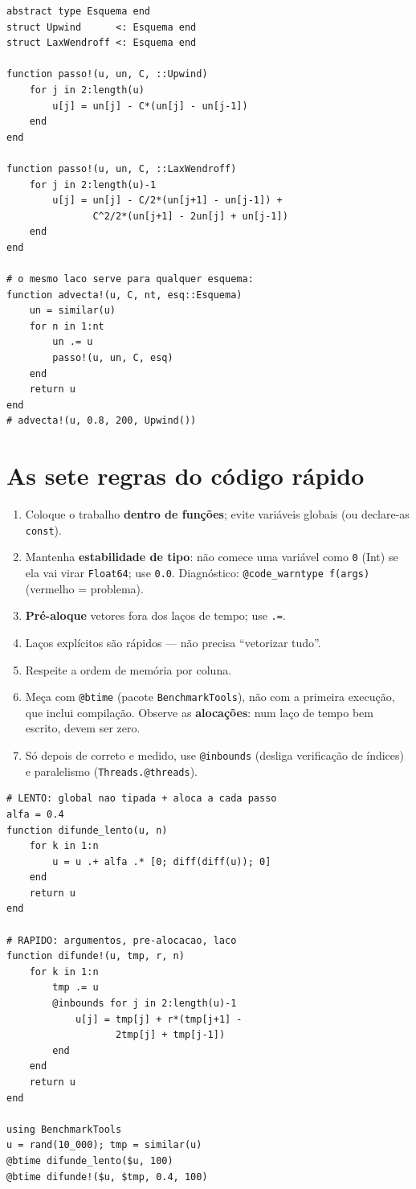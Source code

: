 \documentclass[10pt,a4paper,twocolumn,openany]{report}
\newenvironment{conceito}[1]{\section{#1}}{\par}
\begin{document}
\begin{lstlisting}[caption={Dispatch: um tipo por esquema numerico}]
abstract type Esquema end
struct Upwind      <: Esquema end
struct LaxWendroff <: Esquema end

function passo!(u, un, C, ::Upwind)
    for j in 2:length(u)
        u[j] = un[j] - C*(un[j] - un[j-1])
    end
end

function passo!(u, un, C, ::LaxWendroff)
    for j in 2:length(u)-1
        u[j] = un[j] - C/2*(un[j+1] - un[j-1]) +
               C^2/2*(un[j+1] - 2un[j] + un[j-1])
    end
end

# o mesmo laco serve para qualquer esquema:
function advecta!(u, C, nt, esq::Esquema)
    un = similar(u)
    for n in 1:nt
        un .= u
        passo!(u, un, C, esq)
    end
    return u
end
# advecta!(u, 0.8, 200, Upwind())
\end{lstlisting}

\begin{conceito}{As sete regras do código rápido}
\begin{enumerate}
  \item Coloque o trabalho \textbf{dentro de funções}; evite variáveis
        globais (ou declare-as \texttt{const}).
  \item Mantenha \textbf{estabilidade de tipo}: não comece uma variável como
        \texttt{0} (Int) se ela vai virar \texttt{Float64}; use \texttt{0.0}.
        Diagnóstico: \texttt{@code\_warntype f(args)} (vermelho = problema).
  \item \textbf{Pré-aloque} vetores fora dos laços de tempo; use \texttt{.=}.
  \item Laços explícitos são rápidos --- não precisa ``vetorizar tudo''.
  \item Respeite a ordem de memória por coluna.
  \item Meça com \texttt{@btime} (pacote \texttt{BenchmarkTools}), não com
        a primeira execução, que inclui compilação. Observe as
        \textbf{alocações}: num laço de tempo bem escrito, devem ser zero.
  \item Só depois de correto e medido, use \texttt{@inbounds} (desliga
        verificação de índices) e paralelismo (\texttt{Threads.@threads}).
\end{enumerate}
\end{conceito}

\begin{lstlisting}[caption={Lento vs. rapido: o mesmo calculo}]
# LENTO: global nao tipada + aloca a cada passo
alfa = 0.4
function difunde_lento(u, n)
    for k in 1:n
        u = u .+ alfa .* [0; diff(diff(u)); 0]
    end
    return u
end

# RAPIDO: argumentos, pre-alocacao, laco
function difunde!(u, tmp, r, n)
    for k in 1:n
        tmp .= u
        @inbounds for j in 2:length(u)-1
            u[j] = tmp[j] + r*(tmp[j+1] -
                   2tmp[j] + tmp[j-1])
        end
    end
    return u
end

using BenchmarkTools
u = rand(10_000); tmp = similar(u)
@btime difunde_lento($u, 100)
@btime difunde!($u, $tmp, 0.4, 100)
\end{lstlisting}
\end{document}
